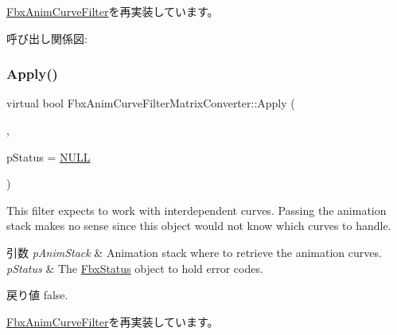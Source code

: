 \hyperlink{class_fbx_anim_curve_filter_ad042b45c0675278fa49e61739b0825c2}{Fbx\+Anim\+Curve\+Filter}を再実装しています。

呼び出し関係図\+:
\mbox{\label{class_fbx_anim_curve_filter_matrix_converter_a20db5fcf27096c750a9b5bfc1ed074e4}} 
\subsubsection{\texorpdfstring{Apply()}{Apply()}\hspace{0.1cm}{\footnotesize\ttfamily [2/7]}}
{\footnotesize\ttfamily virtual bool Fbx\+Anim\+Curve\+Filter\+Matrix\+Converter\+::\+Apply (\begin{DoxyParamCaption}\item[{\hyperlink{class_fbx_anim_stack}{Fbx\+Anim\+Stack} $\ast$}]{,  }\item[{\hyperlink{class_fbx_status}{Fbx\+Status} $\ast$}]{p\+Status = {\ttfamily \hyperlink{fbxarch_8h_a070d2ce7b6bb7e5c05602aa8c308d0c4}{N\+U\+LL}} }\end{DoxyParamCaption})\hspace{0.3cm}{\ttfamily [virtual]}}

This filter expects to work with interdependent curves. Passing the animation stack makes no sense since this object would not know which curves to handle. 
\begin{DoxyParams}{引数}
{\em p\+Anim\+Stack} & Animation stack where to retrieve the animation curves. \\
\hline
{\em p\+Status} & The \hyperlink{class_fbx_status}{Fbx\+Status} object to hold error codes. \\
\hline
\end{DoxyParams}
\begin{DoxyReturn}{戻り値}
{\ttfamily false}. 
\end{DoxyReturn}


\hyperlink{class_fbx_anim_curve_filter_aef3900e6180e05661c27ee484ae939c3}{Fbx\+Anim\+Curve\+Filter}を再実装しています。

\mbox{\label{class_fbx_anim_curve_filter_matrix_converter_a9159d911dfa550f7760ffbb1e3b6cb6b}} 
